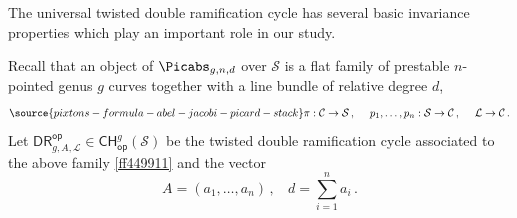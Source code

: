 

The
universal twisted double ramification cycle has several
basic invariance properties
which play
an important role in our study.

Recall that an object of $\Picabs_{g,n,d}$ over $\mathcal{S}$ is
a flat family  of prestable
    $n$-pointed genus $g$ curves together with a line bundle
    of relative degree $d$,
    \begin{equation}
    \label{ff449911}
\source{pixtons-formula-abel-jacobi-picard-stack}
    \pi:\mathcal{C} \rightarrow \mathcal{S}\, , \ \ \ \ p_1,\ldots,p_n: \mathcal{S} \rightarrow \mathcal{C}\, , \ \ \ \
        \mathcal{L} \rightarrow \mathcal{C}\, .
        \end{equation}
    Let $\mathsf{DR}^{\mathsf{op}}_{g,A,\mathcal{L}}\in \mathsf{CH}^g_{\mathsf{op}}(\mathcal{S})$
    be the twisted double ramification cycle associated to the above
    family \eqref{ff449911} and
     the vector
    $$A=(a_1,\ldots, a_n)\, , \ \ \ \ d =\sum_{i=1}^n a_i\, .$$



